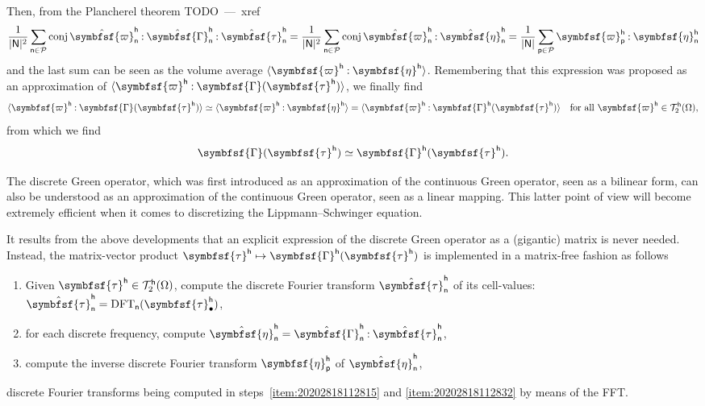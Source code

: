 \documentclass[draft, appendixprefix=true, chapterprefix=true, fontsize=12pt, numbers=noendperiod]{scrbook}
\newcommand{\cellindices}{\mathcal P}
\DeclareMathOperator{\conj}{conj}
\newcommand{\dbldot}{\mathbin{\mathord{:}}}
\DeclareMathOperator{\dft}{DFT}
\newcommand{\tens}[1]{\symbfsf{#1}}
\newcommand{\tensors}{\mathcal T}
\newcommand{\todo}[1]{\color{red}TODO~---~#1\color{black}}
\newcommand{\tuple}[1]{\mathsf{#1}}
\begin{document}
Then, from the Plancherel theorem \todo{xref}
\begin{equation}
  \frac1{\lvert\tuple N\rvert^2}
  \sum_{\tuple n\in\cellindices}\conj\hat{\tens\varpi}_{\tuple n}^{\tuple h}
  \dbldot\hat{\tens\Gamma}_{\tuple n}^{\tuple h}\dbldot
  \hat{\tens\tau}_{\tuple n}^{\tuple h}=\frac1{\lvert\tuple N\rvert^2}
  \sum_{\tuple n\in\cellindices}\conj\hat{\tens\varpi}_{\tuple n}^{\tuple h}
  \dbldot\hat{\tens\eta}_{\tuple n}^{\tuple h}=\frac1{\lvert\tuple N\rvert}
  \sum_{\tuple p\in\cellindices}\tens\varpi_{\tuple p}^{\tuple h}
  \dbldot\tens\eta_{\tuple n}^{\tuple h}
\end{equation}
and the last sum can be seen as the volume average
\(\langle\tens\varpi^{\tuple h}\dbldot\tens\eta^{\tuple
  h}\rangle\). Remembering that this expression was proposed as an
approximation of
\(\langle\tens\varpi^{\tuple h}\dbldot\tens\Gamma(\tens\tau^{\tuple h})\rangle\),
we finally find
\begin{equation}
  \langle\tens\varpi^{\tuple h}\dbldot\tens\Gamma(\tens\tau^{\tuple h})\rangle\simeq\langle\tens\varpi^{\tuple h}\dbldot\tens\eta^{\tuple h}\rangle=\langle\tens\varpi^{\tuple h}\dbldot\tens\Gamma^{\tuple h}(\tens\tau^{\tuple h})\rangle\quad\text{for all }\tens\varpi^{\tuple h}\in\tensors_2^{\tuple h}(\Omega),
\end{equation}
from which we find
\begin{equation}
  \tens\Gamma(\tens\tau^{\tuple h})\simeq\tens\Gamma^{\tuple h}
  (\tens\tau^{\tuple h}).
\end{equation}

The discrete Green operator, which was first introduced as an approximation of
the continuous Green operator, seen as a bilinear form, can also be understood
as an approximation of the continuous Green operator, seen as a linear
mapping. This latter point of view will become extremely efficient when it
comes to discretizing the Lippmann--Schwinger equation.

It results from the above developments that an explicit expression of the
discrete Green operator as a (gigantic) matrix is never needed. Instead, the
matrix-vector product
\(\tens\tau^{\tuple h}\mapsto\tens\Gamma^{\tuple h}(\tens\tau^{\tuple h})\) is
implemented in a matrix-free fashion as follows
\begin{enumerate}
\item\label{item:20202818112815} Given
  \(\tens\tau^{\tuple h}\in\tensors_2^{\tuple h}(\Omega)\), compute the
  discrete Fourier transform \(\hat{\tens\tau}_{\tuple n}^{\tuple h}\) of its
  cell-values:
  \(\hat{\tens\tau}_{\tuple n}^{\tuple h}=\dft_{\tuple
    n}(\tens\tau_\bullet^{\tuple h})\),
\item for each discrete frequency, compute
  \(\hat{\tens\eta}_{\tuple n}^{\tuple h}=\hat{\tens\Gamma}_{\tuple n}^{\tuple
    h}\dbldot\hat{\tens\tau}_{\tuple n}^{\tuple h}\),
\item\label{item:20202818112832} compute the inverse discrete Fourier transform
  \(\tens\eta_{\tuple{p}}^{\tuple h}\) of \(\hat{\tens\eta}_{\tuple{n}}^{\tuple h}\),
\end{enumerate}
discrete Fourier transforms being computed in steps~\ref{item:20202818112815}
and \ref{item:20202818112832} by means of the FFT.
\end{document}
